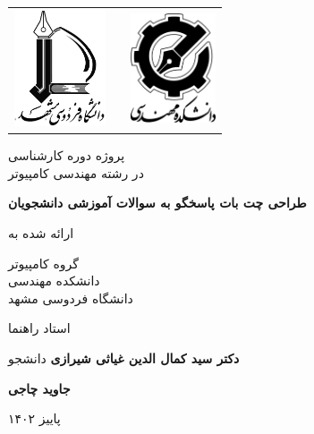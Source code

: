 \documentclass[12pt]{report}
\author{جاوید چاجی}
\date{پاییز ۱۴۰۲}
\begin{document}
    \begin{titlepage}
        \centering
        \begin{tabularx}{\textwidth}{lXr}
            \includegraphics[width=2.7cm]
            {Images/Ferdowsi_University_of_Mashhad_Logo.png}
            &
            &
            \includegraphics[width=2.5cm]{Images/Faculty_of_Engineering_Ferdowsi_University_of_Mashhad_Logo.png}
        \end{tabularx}\par\vspace{1cm}
        {\Large \textsc{پروژه دوره کارشناسی}\\{در رشته مهندسی کامپیوتر}\par}
        \vspace{1.5cm}
        {\huge\bfseries طراحی چت بات پاسخگو به سوالات آموزشی دانشجویان\par}
        \vspace{2cm}
        ارائه شده به\par
        {\LARGE \textsc{گروه کامپیوتر}\\{دانشکده مهندسی}\\{دانشگاه فردوسی مشهد}\par}
        \vspace{2cm}
        استاد راهنما\par
        {\Large\bfseries دکتر سید کمال الدین \textsc{غیاثی شیرازی}}
        \vfill
        دانشجو\par
        {\Large\bfseries جاوید چاجی\par}
    
        \vfill
    
        {\large {پاییز ۱۴۰۲}\par}
    \end{titlepage}
\end{document}
